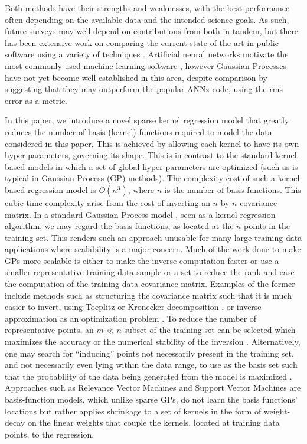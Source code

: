 \documentclass[useAMS,usenatbib,fleqn]{mn2e}
\begin{document}
Both methods have their strengths and weaknesses, with the best performance often depending on the available data and the intended science goals. As such, future surveys may well depend on contributions from both in tandem, but there has been extensive work on comparing the current state of the art in public software using a variety of techniques \citep{hildebrandt10,abdalla11,sanchez14,bonnett2015}. Artificial neural networks motivate the most commonly used machine learning software \citep{Firth2003,vanzella2004photometric,brescia2014catalogue}, however Gaussian Processes \citep[e.g.][]{Way2009} have not yet become well established in this area, despite comparison by \citet{bonfield10} suggesting that they may outperform the popular {\sc ANNz} code, using the rms error as a metric. 


In this paper, we introduce a novel sparse kernel regression model that greatly reduces the number of basis (kernel) functions required to model the data considered in this paper. This is achieved by allowing each kernel to have its own hyper-parameters, governing its shape. This is in contrast to the standard kernel-based models in which a set of global hyper-parameters are optimized (such as is typical in Gaussian Process (GP) methods). The complexity cost of such a kernel-based regression model is $O\left(n^{3}\right)$, where $n$ is the number of basis functions. This cubic time complexity arise from the cost of inverting an $n$ by $n$ covariance matrix. In a standard Gaussian Process model \citep{rasmussen2006gaussian}, seen as a kernel regression algorithm, we may regard the basis functions, as located at the $n$ points in the training set. This renders such an approach unusable for many large training data applications where scalability is a major concern. Much of the work done to make GPs more scalable is either to make the inverse computation faster or use a smaller representative training data sample or a set to reduce the rank and ease the computation of the training data covariance matrix. Examples of the former include methods such as structuring the covariance matrix such that it is much easier to invert, using Toeplitz  \citep{zhang2005time} or Kronecker decomposition \citep{tsiligkaridis2013}, or inverse approximation as an optimization problem \citep{gibbs97}. To reduce the number of representative points, an $m \ll n$ subset of the training set can be selected which maximizes the accuracy or the numerical stability of the inversion \citep{foster2009}. Alternatively, one may search for ``inducing'' points not necessarily present in the training set, and not necessarily even lying within the data range, to use as the basis set such that the probability of the data being generated from the model is maximized \citep{snelson2005}. Approaches such as Relevance Vector Machines \citep[RVM;][]{tipping2001} and Support Vector Machines \citep[SVM;][]{smola1997} are basis-function models, which unlike sparse GPs, do not learn the basis functions' locations but rather applies shrinkage to a set of kernels in the form of weight-decay on the linear weights that couple the kernels, located at training data points, to the regression. 
\end{document}
